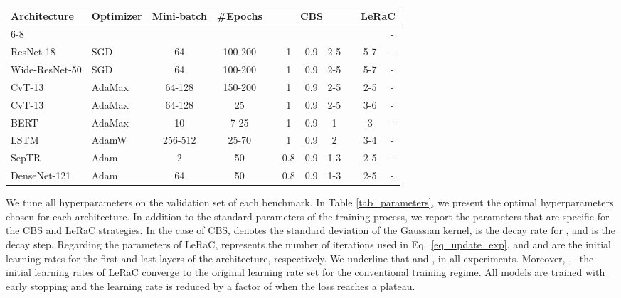 \documentclass[10pt,twocolumn,letterpaper]{article}
\begin{document}
\begin{table*}
\small{
  \begin{center}
\begin{tabular}{llccccccccc}
    \toprule
    \multirow{2}{*}{Architecture}    & \multirow{2}{*}{Optimizer}     & \multirow{2}{*}{Mini-batch}          &  \multirow{2}{*}{\#Epochs}      &  \multirow{2}{*}{}  & \multicolumn{3}{c}{CBS} & & \multicolumn{2}{c}{LeRaC}          \\
    \cline{6-8}
    \cline{10-11}
    & & & & &  &  &  &&  &  - \\
    \midrule
    ResNet-18       & SGD          &  64 &  100-200 &  & 1 & 0.9 & 2-5 && 5-7 &  - \\
    
    Wide-ResNet-50  & SGD          & 64 &   100-200 &  & 1 & 0.9 & 2-5  && 5-7 &  -  \\
    CvT-13          & AdaMax       & 64-128 & 150-200 &  & 1 & 0.9 & 2-5 && 2-5 &  -  \\
    CvT-13 & AdaMax    & 64-128 & 25 &  & 1 & 0.9 & 2-5 && 3-6 &  - \\
    \midrule
    BERT           & AdaMax        & 10     & 7-25 &  & 1 & 0.9 & 1 && 3 &  - \\
    LSTM           & AdamW         & 256-512 & 25-70 &  & 1 & 0.9 & 2 && 3-4 &  -  \\
    \midrule    
    SepTR           & Adam         &  2  &  50  &   & 0.8 & 0.9 & 1-3 && 2-5 &  - \\

    DenseNet-121   & Adam         &  64 &  50  &   &  0.8 & 0.9 & 1-3  && 2-5 &  - \\

    \bottomrule
  \end{tabular}
  \end{center}
  }
  \vspace{-0.6cm}
    \caption{Optimal hyperparameter settings for the various neural architectures used in our experiments.\vspace{-0.3cm}}
    \label{tab_parameters}
\end{table*}

We tune all hyperparameters on the validation set of each benchmark. In Table \ref{tab_parameters}, we present the optimal hyperparameters chosen for each architecture. In addition to the standard parameters of the training process, we report the parameters that are specific for the CBS and LeRaC strategies. In the case of CBS,  denotes the standard deviation of the Gaussian kernel,  is the decay rate for , and  is the decay step. Regarding the parameters of LeRaC,  represents the number of iterations used in Eq.~\eqref{eq_update_exp}, and  and  are the initial learning rates for the first and last layers of the architecture, respectively. We underline that  and , in all experiments. Moreover, , \ie~the initial learning rates of LeRaC converge to the original learning rate set for the conventional training regime. All models are trained with early stopping and the learning rate is reduced by a factor of  when the loss reaches a plateau.
\end{document}
